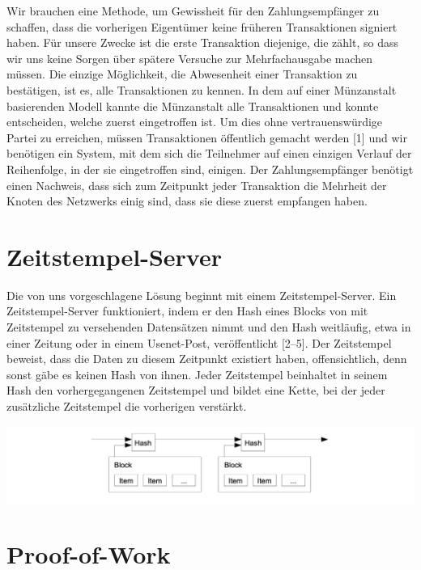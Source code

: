 \documentclass[10pt]{article}
\begin{document}
	Wir brauchen eine Methode, um Gewissheit für den Zahlungsempfänger zu schaffen, dass die vorherigen Eigentümer keine früheren Transaktionen signiert haben. Für unsere Zwecke ist die erste Transaktion diejenige, die zählt, so dass wir uns keine Sorgen über spätere Versuche zur Mehrfachausgabe machen müssen. Die einzige Möglichkeit, die Abwesenheit einer Transaktion zu bestätigen, ist es, alle Transaktionen zu kennen. In dem auf einer Münzanstalt basierenden Modell kannte die Münzanstalt alle Transaktionen und konnte entscheiden, welche zuerst eingetroffen ist. Um dies ohne vertrauenswürdige Partei zu erreichen, müssen Transaktionen öffentlich gemacht werden [1] und wir benötigen ein System, mit dem sich die Teilnehmer auf einen einzigen Verlauf der Reihenfolge, in der sie eingetroffen sind, einigen. Der Zahlungsempfänger benötigt einen Nachweis, dass sich zum Zeitpunkt jeder Transaktion die Mehrheit der Knoten des Netzwerks einig sind, dass sie diese zuerst empfangen haben.

	\section{Zeitstempel-Server}
	
	Die von uns vorgeschlagene Lösung beginnt mit einem Zeitstempel-Server. Ein Zeitstempel-Server funktioniert, indem er den Hash eines Blocks von mit Zeitstempel zu versehenden Datensätzen nimmt und den Hash weitläufig, etwa in einer Zeitung oder in einem Usenet-Post, veröffentlicht [2–5]. Der Zeitstempel beweist, dass die Daten zu diesem Zeitpunkt existiert haben, offensichtlich, denn sonst gäbe es keinen Hash von ihnen. Jeder Zeitstempel beinhaltet in seinem Hash den vorhergegangenen Zeitstempel und bildet eine Kette, bei der jeder zusätzliche Zeitstempel die vorherigen verstärkt.
	
	\begin{center}
		\includegraphics[scale=0.35]{pics/timestampserver.png}
	\end{center}

	\newpage
	
	\section{Proof-of-Work}
	
\end{document}
